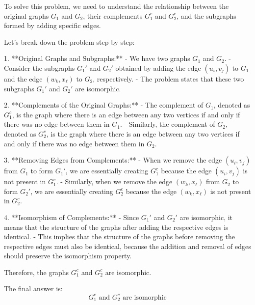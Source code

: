 To solve this problem, we need to understand the relationship between the original graphs \( G_1 \) and \( G_2 \), their complements \( G_1^c \) and \( G_2^c \), and the subgraphs formed by adding specific edges.

Let's break down the problem step by step:

1. **Original Graphs and Subgraphs:**
   - We have two graphs \( G_1 \) and \( G_2 \).
   - Consider the subgraphs \( G_1' \) and \( G_2' \) obtained by adding the edge \( (u_i, v_j) \) to \( G_1 \) and the edge \( (w_k, x_\ell) \) to \( G_2 \), respectively.
   - The problem states that these two subgraphs \( G_1' \) and \( G_2' \) are isomorphic.

2. **Complements of the Original Graphs:**
   - The complement of \( G_1 \), denoted as \( G_1^c \), is the graph where there is an edge between any two vertices if and only if there was no edge between them in \( G_1 \).
   - Similarly, the complement of \( G_2 \), denoted as \( G_2^c \), is the graph where there is an edge between any two vertices if and only if there was no edge between them in \( G_2 \).

3. **Removing Edges from Complements:**
   - When we remove the edge \( (u_i, v_j) \) from \( G_1 \) to form \( G_1' \), we are essentially creating \( G_1^c \) because the edge \( (u_i, v_j) \) is not present in \( G_1^c \).
   - Similarly, when we remove the edge \( (w_k, x_\ell) \) from \( G_2 \) to form \( G_2' \), we are essentially creating \( G_2^c \) because the edge \( (w_k, x_\ell) \) is not present in \( G_2^c \).

4. **Isomorphism of Complements:**
   - Since \( G_1' \) and \( G_2' \) are isomorphic, it means that the structure of the graphs after adding the respective edges is identical.
   - This implies that the structure of the graphs before removing the respective edges must also be identical, because the addition and removal of edges should preserve the isomorphism property.

Therefore, the graphs \( G_1^c \) and \( G_2^c \) are isomorphic.

The final answer is:
\[
\boxed{G_1^c \text{ and } G_2^c \text{ are isomorphic}}
\]